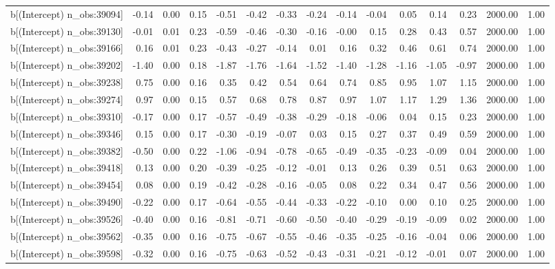 \begin{table}[ht]
\begin{tabular}{rrrrrrrrrrrrrrr}
  b[(Intercept) n\_obs:39094] & -0.14 & 0.00 & 0.15 & -0.51 & -0.42 & -0.33 & -0.24 & -0.14 & -0.04 & 0.05 & 0.14 & 0.23 & 2000.00 & 1.00 \\ 
  b[(Intercept) n\_obs:39130] & -0.01 & 0.01 & 0.23 & -0.59 & -0.46 & -0.30 & -0.16 & -0.00 & 0.15 & 0.28 & 0.43 & 0.57 & 2000.00 & 1.00 \\ 
  b[(Intercept) n\_obs:39166] & 0.16 & 0.01 & 0.23 & -0.43 & -0.27 & -0.14 & 0.01 & 0.16 & 0.32 & 0.46 & 0.61 & 0.74 & 2000.00 & 1.00 \\ 
  b[(Intercept) n\_obs:39202] & -1.40 & 0.00 & 0.18 & -1.87 & -1.76 & -1.64 & -1.52 & -1.40 & -1.28 & -1.16 & -1.05 & -0.97 & 2000.00 & 1.00 \\ 
  b[(Intercept) n\_obs:39238] & 0.75 & 0.00 & 0.16 & 0.35 & 0.42 & 0.54 & 0.64 & 0.74 & 0.85 & 0.95 & 1.07 & 1.15 & 2000.00 & 1.00 \\ 
  b[(Intercept) n\_obs:39274] & 0.97 & 0.00 & 0.15 & 0.57 & 0.68 & 0.78 & 0.87 & 0.97 & 1.07 & 1.17 & 1.29 & 1.36 & 2000.00 & 1.00 \\ 
  b[(Intercept) n\_obs:39310] & -0.17 & 0.00 & 0.17 & -0.57 & -0.49 & -0.38 & -0.29 & -0.18 & -0.06 & 0.04 & 0.15 & 0.23 & 2000.00 & 1.00 \\ 
  b[(Intercept) n\_obs:39346] & 0.15 & 0.00 & 0.17 & -0.30 & -0.19 & -0.07 & 0.03 & 0.15 & 0.27 & 0.37 & 0.49 & 0.59 & 2000.00 & 1.00 \\ 
  b[(Intercept) n\_obs:39382] & -0.50 & 0.00 & 0.22 & -1.06 & -0.94 & -0.78 & -0.65 & -0.49 & -0.35 & -0.23 & -0.09 & 0.04 & 2000.00 & 1.00 \\ 
  b[(Intercept) n\_obs:39418] & 0.13 & 0.00 & 0.20 & -0.39 & -0.25 & -0.12 & -0.01 & 0.13 & 0.26 & 0.39 & 0.51 & 0.63 & 2000.00 & 1.00 \\ 
  b[(Intercept) n\_obs:39454] & 0.08 & 0.00 & 0.19 & -0.42 & -0.28 & -0.16 & -0.05 & 0.08 & 0.22 & 0.34 & 0.47 & 0.56 & 2000.00 & 1.00 \\ 
  b[(Intercept) n\_obs:39490] & -0.22 & 0.00 & 0.17 & -0.64 & -0.55 & -0.44 & -0.33 & -0.22 & -0.10 & 0.00 & 0.10 & 0.25 & 2000.00 & 1.00 \\ 
  b[(Intercept) n\_obs:39526] & -0.40 & 0.00 & 0.16 & -0.81 & -0.71 & -0.60 & -0.50 & -0.40 & -0.29 & -0.19 & -0.09 & 0.02 & 2000.00 & 1.00 \\ 
  b[(Intercept) n\_obs:39562] & -0.35 & 0.00 & 0.16 & -0.75 & -0.67 & -0.55 & -0.46 & -0.35 & -0.25 & -0.16 & -0.04 & 0.06 & 2000.00 & 1.00 \\ 
  b[(Intercept) n\_obs:39598] & -0.32 & 0.00 & 0.16 & -0.75 & -0.63 & -0.52 & -0.43 & -0.31 & -0.21 & -0.12 & -0.01 & 0.07 & 2000.00 & 1.00 \\ 

\end{tabular}
\end{table}
